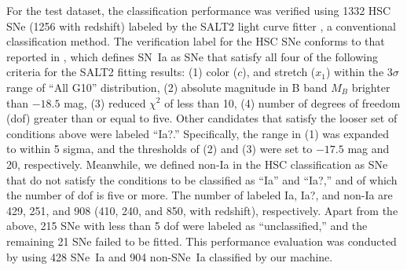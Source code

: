 \documentclass[useamsfonts]{pasj01}
\begin{document}
For the test dataset, the classification performance was verified using 1332 HSC SNe (1256 with redshift) labeled by the SALT2 light curve fitter \citep{guy2007,guy10b}, a conventional classification method.
The verification label for the HSC SNe conforms to that reported in \citet{yasuda19a}, which defines SN~Ia as SNe that satisfy all four of the following criteria for the SALT2 fitting results:
(1) color ($c$), and stretch ($x_1$) within the $3\sigma$ range of \citet{scolnickessler2016} ``All G10'' distribution, (2) absolute magnitude in B band $M_B$ brighter than $-18.5$ mag, (3) reduced $\chi ^{2}$ of less than 10, (4) number of degrees of freedom (dof) greater than or equal to five.
Other candidates that satisfy the looser set of conditions above were labeled ``Ia?.''
Specifically, the range in (1) was expanded to within 5 sigma, and the thresholds of (2) and (3) were set to $-17.5$ mag and 20, respectively.
Meanwhile, we defined non-Ia in the HSC classification as SNe that do not satisfy the conditions to be classified as ``Ia'' and ``Ia?,'' and of which the number of dof is five or more.
The number of labeled Ia, Ia?, and non-Ia are 429, 251, and 908 (410, 240, and 850, with redshift), respectively.
Apart from the above, 215 SNe with less than 5 dof were labeled as ``unclassified,'' and the remaining 21 SNe failed to be fitted.
This performance evaluation was conducted by using 428 SNe~Ia and 904 non-SNe~Ia classified by our machine.
\end{document}
